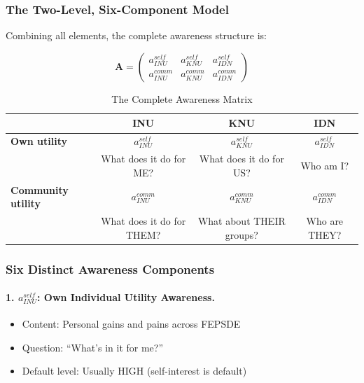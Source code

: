 \subsubsection{The Two-Level, Six-Component Model}

Combining all elements, the complete awareness structure is:

\begin{equation}
\boxed{
\mathbf{A} = \begin{pmatrix}
a^{self}_{INU} & a^{self}_{KNU} & a^{self}_{IDN} \\
a^{comm}_{INU} & a^{comm}_{KNU} & a^{comm}_{IDN}
\end{pmatrix}
}
\label{eq:awareness-matrix}
\end{equation}

\begin{table}[htbp]
\centering
\caption{The Complete Awareness Matrix}
\label{tab:awareness-matrix}
\renewcommand{\arraystretch}{1.5}
\begin{tabular}{@{}l|ccc@{}}
\toprule
& \textbf{INU} & \textbf{KNU} & \textbf{IDN} \\
\midrule
\textbf{Own utility} & $a^{self}_{INU}$ & $a^{self}_{KNU}$ & $a^{self}_{IDN}$ \\
& What does it do for ME? & What does it do for US? & Who am I? \\
\midrule
\textbf{Community utility} & $a^{comm}_{INU}$ & $a^{comm}_{KNU}$ & $a^{comm}_{IDN}$ \\
& What does it do for THEM? & What about THEIR groups? & Who are THEY? \\
\bottomrule
\end{tabular}
\end{table}

\subsubsection{Six Distinct Awareness Components}

\paragraph{1. $a^{self}_{INU}$: Own Individual Utility Awareness.}
\begin{itemize}
\item Content: Personal gains and pains across FEPSDE
\item Question: ``What's in it for me?''
\item Default level: Usually HIGH (self-interest is default)
\end{itemize}

